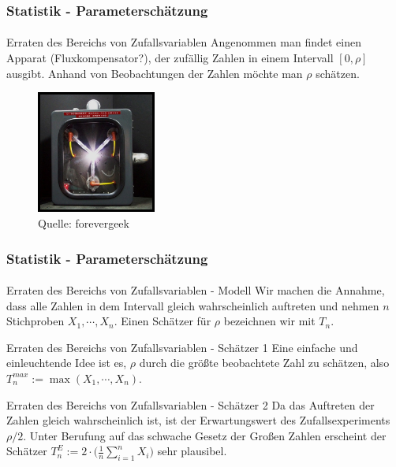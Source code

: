 \documentclass{beamer}
\begin{document}
\begin{frame}
    \frametitle{Statistik - Parameterschätzung}
\framesubtitle{}

\begin{block}{Erraten des Bereichs von Zufallsvariablen}
Angenommen man findet einen Apparat (Fluxkompensator?), der zufällig Zahlen in einem Intervall $[0, \rho]$ ausgibt. Anhand von Beobachtungen der Zahlen möchte man $\rho$ schätzen.
\end{block}

\begin{figure}[htp]
      \centering
    \includegraphics[width=0.35\textwidth]{img/flux}
      \caption{Quelle: forevergeek}
\end{figure}
 \end{frame}


\begin{frame}
    \frametitle{Statistik - Parameterschätzung}
\framesubtitle{}

\begin{block}{Erraten des Bereichs von Zufallsvariablen - Modell}
 Wir machen die Annahme, dass alle Zahlen in dem Intervall gleich wahrscheinlich auftreten und  nehmen $n$ Stichproben $X_1, \cdots, X_n$.
Einen Schätzer für $\rho$ bezeichnen wir mit $T_n$.
\end{block}

\begin{block}{Erraten des Bereichs von Zufallsvariablen - Schätzer 1}
Eine einfache und einleuchtende Idee ist es, $\rho$ durch die größte beobachtete Zahl zu schätzen, also
$T_n^{max} := \max(X_1, \cdots, X_n)$.
 \end{block}

\begin{block}{Erraten des Bereichs von Zufallsvariablen - Schätzer 2}
Da das Auftreten der Zahlen gleich wahrscheinlich ist, ist der Erwartungswert des Zufallsexperiments $\rho /2$. Unter Berufung auf das  schwache Gesetz der Großen Zahlen erscheint der Schätzer
$T_n^{E} :=  2 \cdot \biggl( \frac{1}{n} \sum_{i=1}^n X_i \biggr)$ sehr plausibel.
 \end{block}

 \end{frame}
\end{document}
